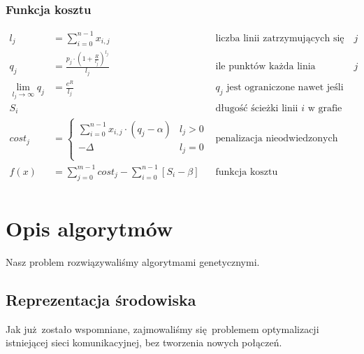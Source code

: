 \documentclass[12pt,a4paper,openright]{mwrep}
\begin{document}
\subsection{Funkcja kosztu}
\begin{align*}
    l_j                         & = \sum_{i=0}^{n-1} x_{i, j}                                               & \text{liczba linii zatrzymujących się na przystanku $j$}                 \\
    q_j                         & = \frac{p_j \cdot (1+\frac{R}{l_j})^{l_j}}{l_j}                           & \text{ile punktów każda linia uzyskuje z przystanku $j$}                 \\
    \lim_{l_{j}\to\infty} q_{j} & =  \frac{e^R}{l_j}                                                        & \text{$q_{j}$ jest ograniczone nawet jeśli liczba lini jest bardzo duża} \\
    S_{i}                       &                                                                           & \text{długość ścieżki linii $i$ w grafie}                                \\
    cost_{j}                    & = \begin{cases}
        \sum_{i=0}^{n-1} x_{i,j} \cdot (q_j-\alpha) & l_j > 0 \\
        -\Delta                                     & l_j = 0 \\
    \end{cases}                                               & \text{penalizacja nieodwiedzonych przystanków}                           \\
    f(x)                        & = \sum_{j=0}^{m-1} cost_{j} - \sum_{i=0}^{n-1} \left[ S_{i}-\beta \right] & \text{funkcja kosztu}                                                    \\
\end{align*}







\chapter{Opis algorytmów}
Nasz problem rozwiązywaliśmy algorytmami genetycznymi.

\section{Reprezentacja środowiska}
Jak już zostało wspomniane, zajmowaliśmy się problemem optymalizacji istniejącej sieci komunikacyjnej, bez tworzenia nowych połączeń.
\end{document}

